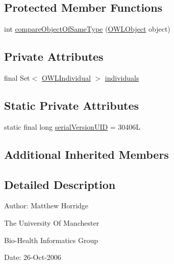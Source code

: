 \subsection*{Protected Member Functions}
\begin{DoxyCompactItemize}
\item 
int \hyperlink{classuk_1_1ac_1_1manchester_1_1cs_1_1owl_1_1owlapi_1_1_o_w_l_nary_individual_axiom_impl_a8463a25e147fd013e2320aa9bb345c54}{compare\-Object\-Of\-Same\-Type} (\hyperlink{interfaceorg_1_1semanticweb_1_1owlapi_1_1model_1_1_o_w_l_object}{O\-W\-L\-Object} object)
\end{DoxyCompactItemize}
\subsection*{Private Attributes}
\begin{DoxyCompactItemize}
\item 
final Set$<$ \hyperlink{interfaceorg_1_1semanticweb_1_1owlapi_1_1model_1_1_o_w_l_individual}{O\-W\-L\-Individual} $>$ \hyperlink{classuk_1_1ac_1_1manchester_1_1cs_1_1owl_1_1owlapi_1_1_o_w_l_nary_individual_axiom_impl_aa2ee45265a7a0c1f5cc9260ac97ac071}{individuals}
\end{DoxyCompactItemize}
\subsection*{Static Private Attributes}
\begin{DoxyCompactItemize}
\item 
static final long \hyperlink{classuk_1_1ac_1_1manchester_1_1cs_1_1owl_1_1owlapi_1_1_o_w_l_nary_individual_axiom_impl_a5b752ea401100ff906a3f178b45be9c2}{serial\-Version\-U\-I\-D} = 30406\-L
\end{DoxyCompactItemize}
\subsection*{Additional Inherited Members}


\subsection{Detailed Description}
Author\-: Matthew Horridge\par
 The University Of Manchester\par
 Bio-\/\-Health Informatics Group\par
 Date\-: 26-\/\-Oct-\/2006\par
\par
 

